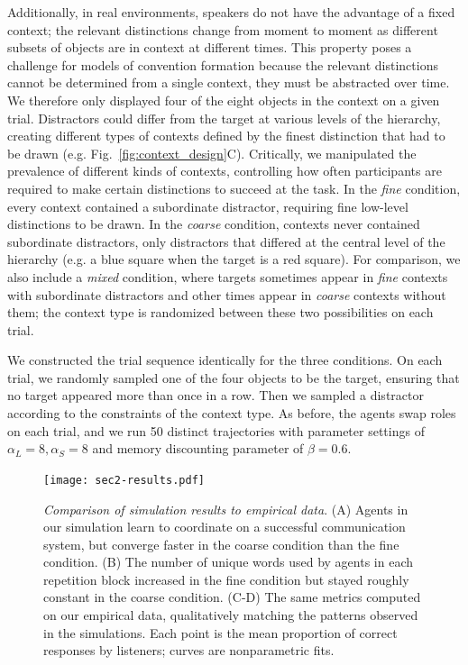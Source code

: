Additionally, in real environments, speakers do not have the advantage of a fixed context; the relevant distinctions change from moment to moment as different subsets of objects are in context at different times. 
This property poses a challenge for models of convention formation because the relevant distinctions cannot be determined from a single context, they must be abstracted over time.
We therefore only displayed four of the eight objects in the context on a given trial.
Distractors could differ from the target at various levels of the hierarchy, creating different types of contexts defined by the finest distinction that had to be drawn (e.g. Fig.~\ref{fig:context_design}C).  
Critically, we manipulated the prevalence of different kinds of contexts, controlling how often participants are required to make certain distinctions to succeed at the task. 
In the \emph{fine} condition, every context contained a subordinate distractor, requiring fine low-level distinctions to be drawn.
In the \emph{coarse} condition, contexts never contained subordinate distractors, only distractors that differed at the central level of the hierarchy (e.g. a blue square when the target is a red square).
For comparison, we also include a \emph{mixed} condition, where targets sometimes appear in \emph{fine} contexts with subordinate distractors and other times appear in \emph{coarse} contexts without them; the context type is randomized between these two possibilities on each trial.

We constructed the trial sequence identically for the three conditions. 
On each trial, we randomly sampled one of the four objects to be the target, ensuring that no target appeared more than once in a row.
Then we sampled a distractor according to the constraints of the context type.
As before, the agents swap roles on each trial, and we run 50 distinct trajectories with parameter settings of $\alpha_L=8, \alpha_S=8$ and memory discounting parameter of $\beta = 0.6$.%


\begin{figure}[t]
\begin{center}
\texttt{[image: sec2-results.pdf]}
\caption{\emph{Comparison of simulation results to empirical data}. (A) Agents in our simulation learn to coordinate on a successful communication system, but converge faster in the coarse condition than the fine condition.  (B) The number of unique words used by agents in each repetition block increased in the fine condition but stayed roughly constant in the coarse condition. (C-D) The same metrics computed on our empirical data, qualitatively matching the patterns observed in the simulations. Each point is the mean proportion of correct responses by listeners; curves are nonparametric fits.}
\label{fig:sec2Results}
\end{center}
\end{figure}

